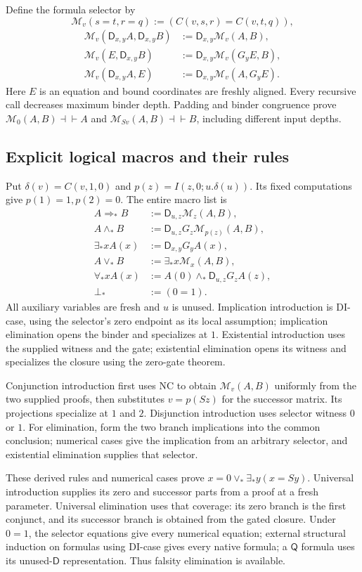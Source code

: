 \documentclass[11pt,letterpaper]{article}
\theoremstyle{definition}\newtheorem{definition}[theorem]{Definition}
\theoremstyle{remark}\newtheorem{remark}[theorem]{Remark}
\newcommand{\D}{\mathsf D}
\newcommand{\Q}{\mathsf Q}
\begin{document}
Define the formula selector by
\[
 \mathcal M_v(s=t,r=q):=(C(v,s,r)=C(v,t,q)),
\]
\[
\begin{aligned}
 \mathcal M_v(\D_{x,y}A,\D_{x,y}B)&:=\D_{x,y}\mathcal M_v(A,B),\\
 \mathcal M_v(E,\D_{x,y}B)&:=\D_{x,y}\mathcal M_v(G_yE,B),\\
 \mathcal M_v(\D_{x,y}A,E)&:=\D_{x,y}\mathcal M_v(A,G_yE).
\end{aligned}
\]
Here $E$ is an equation and bound coordinates are freshly aligned.
Every recursive call decreases maximum binder depth. Padding and binder
congruence prove $\mathcal M_0(A,B)\dashv\vdash A$ and
$\mathcal M_{Sv}(A,B)\dashv\vdash B$, including different input depths.

\subsection{Explicit logical macros and their rules}
Put $\delta(v)=C(v,1,0)$ and $p(z)=I(z,0;u.\delta(u))$.
Its fixed computations give $p(1)=1,p(2)=0$. The entire macro list is
\[
\begin{aligned}
 A\Rightarrow_*B&:=\D_{u,z}\mathcal M_z(A,B),\\
 A\wedge_*B&:=\D_{u,z}G_z\mathcal M_{p(z)}(A,B),\\
 \exists_*xA(x)&:=\D_{x,y}G_yA(x),\\
 A\vee_*B&:=\exists_*x\mathcal M_x(A,B),\\
 \forall_*xA(x)&:=A(0)\wedge_*\D_{u,z}G_zA(z),\\
 \bot_*&:=(0=1).
\end{aligned}
\]
All auxiliary variables are fresh and $u$ is unused. Implication
introduction is DI-case, using the selector's zero endpoint as its local
assumption; implication elimination opens the binder and specializes at
$1$. Existential introduction uses the supplied witness and the gate;
existential elimination opens its witness and specializes the closure
using the zero-gate theorem.

Conjunction introduction first uses NC to obtain
$\mathcal M_v(A,B)$ uniformly from the two supplied proofs, then
substitutes $v=p(Sz)$ for the successor matrix. Its projections specialize
at $1$ and $2$. Disjunction introduction uses selector witness $0$ or
$1$. For elimination, form the two branch implications into the common
conclusion; numerical cases give the implication from an arbitrary
selector, and existential elimination supplies that selector.

These derived rules and numerical cases prove
$x=0\vee_*\exists_*y(x=Sy)$. Universal introduction supplies its zero
and successor parts from a proof at a fresh parameter. Universal
elimination uses that coverage: its zero branch is the first conjunct,
and its successor branch is obtained from the gated closure. Under
$0=1$, the selector equations give every numerical equation; external structural
induction on formulas using DI-case gives every native formula; a
$\Q$ formula uses its unused-$\D$ representation. Thus
falsity elimination is available.
\end{document}
